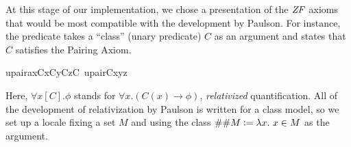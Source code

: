 At this stage of our implementation, we chose a presentation of the
$\mathit{ZF}$ axioms that would be most
compatible with the development by Paulson. For
instance, the predicate
takes a ``class'' (unary predicate) $C$ as an argument and states that
$C$ satisfies the Pairing Axiom.
\begin{isabelle}
upair{\isacharunderscore}ax{\isacharparenleft}C{\isacharparenright}{\isacharequal}{\isacharequal}{\isasymforall}x{\isacharbrackleft}C{\isacharbrackright}{\isachardot}{\isasymforall}y{\isacharbrackleft}C{\isacharbrackright}{\isachardot}{\isasymexists}z{\isacharbrackleft}C{\isacharbrackright}{\isachardot}\ upair{\isacharparenleft}C{\isacharcomma}x{\isacharcomma}y{\isacharcomma}z{\isacharparenright}
\end{isabelle}
Here, $\forall x[C]. \phi$ stands for
$\forall x. (C(x) \longrightarrow \phi)$, \emph{relativized}
quantification. All of the development of relativization by Paulson is
written for a class model, so we set up a locale fixing a set $M$
and using the class $\#\#M\defi \lambda x. \ x\in M$ as the argument. 
